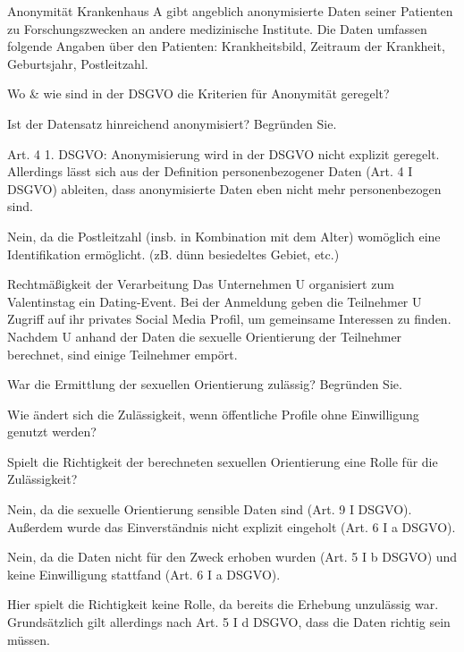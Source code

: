 \documentclass{exercisesheet}
\begin{document}
\begin{eexercises}{Anonymität}{
    Krankenhaus A gibt angeblich anonymisierte Daten seiner Patienten zu Forschungszwecken an andere medizinische Institute. Die Daten umfassen folgende Angaben über den Patienten: Krankheitsbild, Zeitraum der Krankheit, Geburtsjahr, Postleitzahl.
  }
  \item Wo \& wie sind in der DSGVO die Kriterien für Anonymität geregelt?
  \item Ist der Datensatz hinreichend anonymisiert? Begründen Sie.
\end{eexercises}

\begin{solutions}
  \item Art. 4 1. DSGVO: Anonymisierung wird in der DSGVO nicht explizit geregelt. Allerdings lässt sich aus der Definition personenbezogener Daten (Art. 4 I DSGVO) ableiten, dass anonymisierte Daten eben nicht mehr personenbezogen sind.
  \item Nein, da die Postleitzahl (insb. in Kombination mit dem Alter) womöglich eine Identifikation ermöglicht. (zB. dünn besiedeltes Gebiet, etc.)
\end{solutions}

\begin{eexercises}{Rechtmäßigkeit der Verarbeitung}{
    Das Unternehmen U organisiert zum Valentinstag ein Dating-Event. Bei der Anmeldung geben die Teilnehmer U Zugriff auf ihr privates Social Media Profil, um gemeinsame Interessen zu finden. Nachdem U anhand der Daten die sexuelle Orientierung der Teilnehmer berechnet, sind einige Teilnehmer empört.
  }
  \item War die Ermittlung der sexuellen Orientierung zulässig? Begründen Sie.
  \item Wie ändert sich die Zulässigkeit, wenn öffentliche Profile ohne Einwilligung genutzt werden?
  \item Spielt die Richtigkeit der berechneten sexuellen Orientierung eine Rolle für die Zulässigkeit?
\end{eexercises}

\begin{solutions}
  \item Nein, da die sexuelle Orientierung sensible Daten sind (Art. 9 I DSGVO). Außerdem wurde das Einverständnis nicht explizit eingeholt (Art. 6 I a DSGVO).
  \item Nein, da die Daten nicht für den Zweck erhoben wurden (Art. 5 I b DSGVO) und keine Einwilligung stattfand (Art. 6 I a DSGVO).
  \item Hier spielt die Richtigkeit keine Rolle, da bereits die Erhebung unzulässig war. Grundsätzlich gilt allerdings nach Art. 5 I d DSGVO, dass die Daten richtig sein müssen.
\end{solutions}
\end{document}
